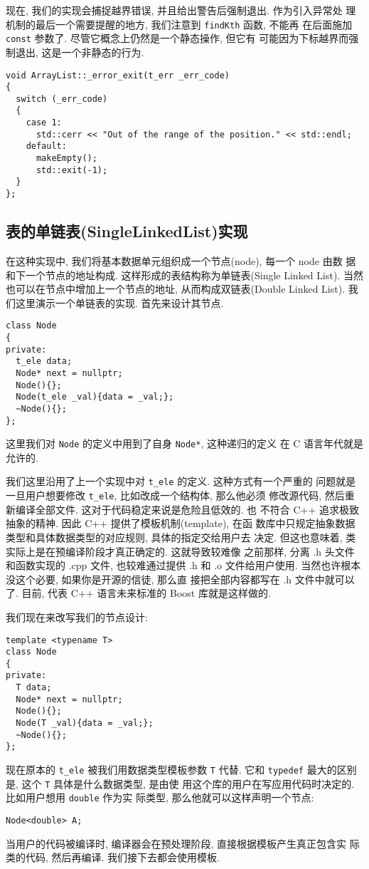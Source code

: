 \documentclass[a4paper]{ctexart}
\theoremstyle{definition}
\theoremstyle{definition}
\begin{document}
现在, 我们的实现会捕捉越界错误, 并且给出警告后强制退出. 作为引入异常处
理机制的最后一个需要提醒的地方, 我们注意到 \verb|findKth| 函数, 不能再
在后面施加 \verb|const| 参数了. 尽管它概念上仍然是一个静态操作, 但它有
可能因为下标越界而强制退出, 这是一个非静态的行为. 
\begin{verbatim}
void ArrayList::_error_exit(t_err _err_code)
{
  switch (_err_code)
  {
    case 1:
      std::cerr << "Out of the range of the position." << std::endl;
    default:
      makeEmpty();
      std::exit(-1);
  }
};
\end{verbatim}

\subsection{表的单链表(SingleLinkedList)实现}
在这种实现中, 我们将基本数据单元组织成一个节点(node), 每一个 node 由数
据和下一个节点的地址构成. 这样形成的表结构称为单链表(Single Linked
List). 当然也可以在节点中增加上一个节点的地址, 从而构成双链表(Double
Linked List). 我们这里演示一个单链表的实现. 首先来设计其节点.

\begin{verbatim}
class Node
{
private:
  t_ele data;
  Node* next = nullptr; 
  Node(){};
  Node(t_ele _val){data = _val;};
  ~Node(){};
};
\end{verbatim}
这里我们对 \verb|Node| 的定义中用到了自身 \verb|Node*|, 这种递归的定义
在 C 语言年代就是允许的.

我们这里沿用了上一个实现中对 \verb|t_ele| 的定义. 这种方式有一个严重的
问题就是一旦用户想要修改 \verb|t_ele|, 比如改成一个结构体, 那么他必须
修改源代码, 然后重新编译全部文件. 这对于代码稳定来说是危险且低效的. 也
不符合 C++ 追求极致抽象的精神. 因此 C++ 提供了模板机制(template), 在函
数库中只规定抽象数据类型和具体数据类型的对应规则, 具体的指定交给用户去
决定. 但这也意味着, 类实际上是在预编译阶段才真正确定的. 这就导致较难像
之前那样, 分离 .h 头文件和函数实现的 .cpp 文件, 也较难通过提供 .h 和
.o 文件给用户使用. 当然也许根本没这个必要, 如果你是开源的信徒, 那么直
接把全部内容都写在 .h 文件中就可以了. 目前, 代表 C++ 语言未来标准的
Boost 库就是这样做的.

我们现在来改写我们的节点设计:
\begin{verbatim}
template <typename T>
class Node
{
private:
  T data;
  Node* next = nullptr; 
  Node(){};
  Node(T _val){data = _val;};
  ~Node(){};
};
\end{verbatim}
现在原本的 \verb|t_ele| 被我们用数据类型模板参数 \verb|T| 代替. 它和
\verb|typedef| 最大的区别是, 这个 \verb|T| 具体是什么数据类型, 是由使
用这个库的用户在写应用代码时决定的. 比如用户想用 \verb|double| 作为实
际类型, 那么他就可以这样声明一个节点:
\begin{verbatim}
Node<double> A;
\end{verbatim}
当用户的代码被编译时, 编译器会在预处理阶段, 直接根据模板产生真正包含实
际类的代码, 然后再编译. 我们接下去都会使用模板.
\end{document}
